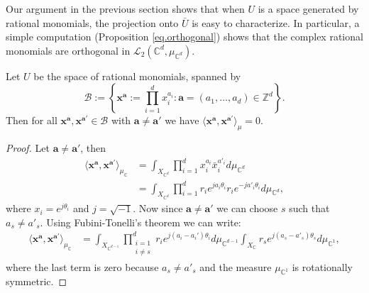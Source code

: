 \documentclass[twoside,11pt]{article}
\begin{document}
Our argument in the previous section shows that when $U$ is a space generated by rational monomials, the projection onto $\bar U$ is easy to characterize. In particular, a simple computation (Proposition \eqref{eq.orthogonal}) shows that the complex rational monomials are orthogonal in $\mathscr L_2( \mathbb C^d, \mu_{\mathbb C^d})$.
\begin{proposition} \label{eq.orthogonal}
Let $U$ be the space of rational monomials, spanned by
\begin{equation}
\mathcal B:=\left\{\mathbf x^{\mathbf a}:= \prod_{i=1}^d x_i^{a_i}: \mathbf a=(a_1,\ldots , a_d) \in \mathbb Z^d\right\}.
\end{equation} 
Then  for all  $\mathbf x^{\mathbf a}, \mathbf x^{\mathbf a'} \in \mathcal B$ with $\mathbf a \neq \mathbf a'$ we have $\langle\mathbf x^{\mathbf a}, \mathbf x^{\mathbf a'}\rangle_\mu = 0$.
\end{proposition}
\begin{proof} Let $\mathbf a \neq \mathbf a'$, then
\begin{align}
 \langle\mathbf x^{\mathbf a}, \mathbf x^{\mathbf a'}\rangle_{\mu_{\mathbb C}} &= \int_{ X_{\mathbb C^d} } \prod_{i=1}^d x_i^{a_{i}} \bar{x}_i^{a'_{i}} d\mu_{\mathbb C^d} \\
&= \int_{X_{\mathbb C^d}}\prod_{i=1}^d r_ie^{j a_i \theta_i} r_ie^{- j a'_i \theta_i}  d\mu_{\mathbb C^d},
\end{align}
where $x_i=e^{j \theta_i}$ and $j=\sqrt{-1}$. Now since $\mathbf a\neq \mathbf a'$ we can choose $s$ such that $a_s\neq a'_s$. Using Fubini-Tonelli's theorem we can write:
\begin{align}
\langle\mathbf x^{\mathbf a}, \mathbf x^{\mathbf a'}\rangle_{\mu_{\mathbb C}}
&= \int_{ X_{\mathbb C^{d-1}}}  \prod_{\substack{i=1\\ i\neq s}}^d r_i e^{j (a_i - a_i') \theta_i}  d\mu_{\mathbb C^{d-1}} \int_{X_{\mathbb C}} r_s e^{j (a_s-a'_s )\theta_s} d\mu_{\mathbb C^1} ,
\end{align}
where the last term is zero because $a_s\neq a'_s$ and the measure $\mu_{\mathbb C^1}$ is rotationally symmetric. 
\end{proof}



\end{document}

